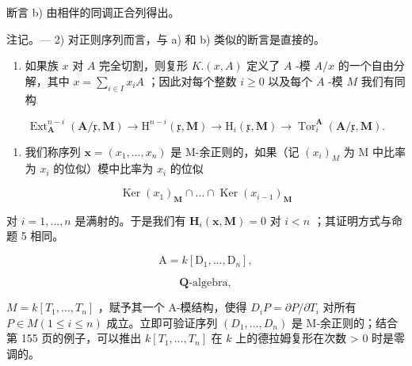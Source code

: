 断言 b) 由相伴的同调正合列得出。

注记。--- 2) 对正则序列而言，与 a) 和 b) 类似的断言是直接的。

\begin{enumerate}
\def\labelenumi{\arabic{enumi})}
\setcounter{enumi}{2}
\tightlist
\item
  如果族 \(x\) 对 \(A\) 完全切割，则复形 \(K.(x, A)\) 定义了 \(A\) -模 \(A/x\) 的一个自由分解，其中 \(x = \sum_{i \in I} x_i A\) ；因此对每个整数 \(i \geqslant 0\) 以及每个 \(A\) -模 \(M\) 我们有同构
\end{enumerate}

\[
\operatorname{Ext} _ {\mathbf {A}} ^ {n - i} (\mathbf {A} / \mathfrak {x}, \mathbf {M}) \rightarrow \mathrm{H} ^ {n - i} (\mathfrak {x}, \mathbf {M}) \rightarrow \mathrm{H} _ {i} (\mathfrak {x}, \mathbf {M}) \rightarrow \operatorname{Tor} _ {i} ^ {\mathbf {A}} (\mathbf {A} / \mathfrak {x}, \mathbf {M}).\tag{15}
\]

\begin{enumerate}
\def\labelenumi{\arabic{enumi})}
\setcounter{enumi}{3}
\tightlist
\item
  我们称序列 \(\boldsymbol{x} = (x_1, \dots, x_n)\) 是 M-余正则的，如果（记 \((x_i)_M\) 为 M 中比率为 \(x_i\) 的位似）模中比率为 \(x_i\) 的位似
\end{enumerate}

\[
\operatorname{Ker} \left(x _ {1}\right) _ {\mathbf {M}} \cap \dots \cap \operatorname{Ker} \left(x _ {i - 1}\right) _ {\mathbf {M}}
\]

对 \(i = 1, \ldots, n\) 是满射的。于是我们有 \(\mathbf{H}_{i}(\mathbf{x}, \mathbf{M}) = 0\) 对 \(i < n\) ；其证明方式与命题 5 相同。

\[
\mathrm{A} = k \left[ \mathrm{D} _ {1}, \dots , \mathrm{D} _ {n} \right],
\]

\[
\mathbf {Q} \text {-algebra},
\]

\(M = k[T_1, \ldots, T_n]\) ，赋予其一个 A-模结构，使得 \(D_i P = \partial P / \partial T_i\) 对所有 \(P \in M (1 \leqslant i \leqslant n)\) 成立。立即可验证序列 \((D_1, \ldots, D_n)\) 是 M-余正则的；结合第 155 页的例子，可以推出 \(k[T_1, \ldots, T_n]\) 在 \(k\) 上的德拉姆复形在次数 \textgreater{} 0 时是零调的。

